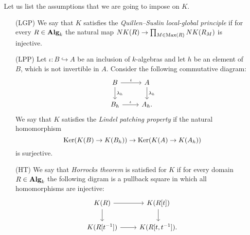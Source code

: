 \documentclass[oneside, 11pt]{amsart} \pdfoutput=1
\begin{document}
\begin{df}\label{df:key-assumptions} Let us list the assumptions that we are going to impose on $K$.
 \begin{itemize}
  \item[(LGP)] \label{LGP} We say that $K$ satisfies the {\it Quillen--Suslin local-global principle} if for every $R\in{\normalfont\textbf{Alg}}_k$ the natural map $NK(R) \to \prod_{M \in \mathrm{Max}(R)} NK(R_M)$ is injective.
  \item[(LPP)] \label{LPP} Let $\iota \colon B \hookrightarrow A$ be an inclusion of $k$-algebras and let $h$ be an element of $B$, which is not invertible in $A$. Consider the following commutative diagram: 
  \[\begin{tikzcd} B \ar{r}{\iota} \ar{d}{\lambda_h} & A \ar{d}{\lambda_h}\\ B_h \ar{r}{\iota} & A_h. \end{tikzcd}\]
  We say that $K$ satisfies the {\it Lindel patching property} if the natural homomorphism \[\mathop{\mathrm{Ker}}\nolimits(K(B) \to K(B_h)) \to \mathop{\mathrm{Ker}}\nolimits(K(A) \to K(A_h))\] is surjective.
  \item[(HT)] \label{HT} We say that {\it Horrocks theorem} is satisfied for $K$ if for every domain $R \in {\normalfont\textbf{Alg}}_k$ the following digram is a pullback square in which all homomorphisms are injective: %
  \[\begin{tikzcd} K(R) \ar[r] \ar[d] & K(R[t]) \ar[d] \\ K(R[t^{-1}]) \ar[r] & K(R[t, t^{-1}]). \end{tikzcd} \]
 \end{itemize}
\end{df}
\end{document}
